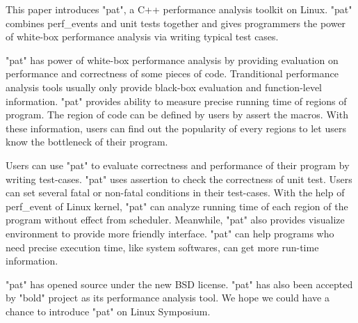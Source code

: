 This paper introduces "pat", a C++ performance analysis toolkit on Linux.
"pat" combines perf_events and unit tests together and gives programmers the power of white-box performance analysis via writing typical test cases.

"pat" has power of white-box performance analysis by providing evaluation on performance and correctness of some pieces of code.
Tranditional performance analysis tools usually only provide black-box evaluation and function-level information.
"pat" provides ability to measure precise running time of regions of program.
The region of code can be defined by users by assert the macros. 
With these information, users can find out the popularity of every regions to let users know the bottleneck of their program.

Users can use "pat" to evaluate correctness and performance of their program by writing test-cases.
"pat" uses assertion to check the correctness of unit test. 
Users can set several fatal or non-fatal conditions in their test-cases.
With the help of perf_event of Linux kernel, "pat" can analyze running time of each region of the program without effect from scheduler. 
Meanwhile, "pat" also provides visualize environment to provide more friendly interface.
"pat" can help programs who need precise execution time, like system softwares, can get more run-time information.

"pat" has opened source under the new BSD license. 
"pat" has also been accepted by "bold" project as its performance analysis tool.
We hope we could have a chance to introduce "pat" on Linux Symposium.
